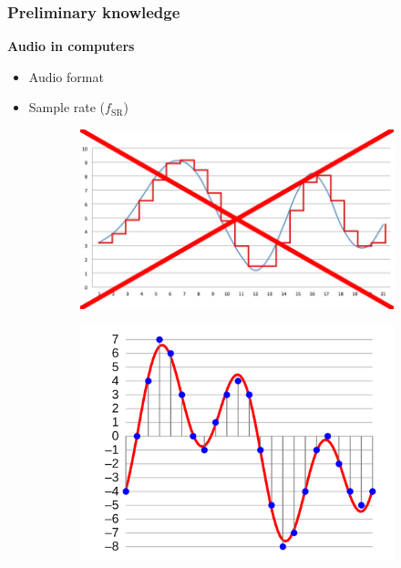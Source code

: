 \documentclass[table]{beamer}
\begin{document}
\begin{frame}
\frametitle{Preliminary knowledge}
    {\large \textbf{Audio in computers}}
    \begin{itemize}
        \item Audio format
        \item Sample rate ($f_{\text{SR}}$)
    \end{itemize}

    \begin{figure}[H]\vspace{-14mm}
        \begin{subfigure}{.45\textwidth}
            \includegraphics[width=\linewidth]{figures/no_sampling.png}
        \end{subfigure}
        \begin{subfigure}{.54\textwidth}
            \includegraphics[width=\linewidth]{figures/sampling.png}
        \end{subfigure}
    \end{figure}
\end{frame}
\end{document}
